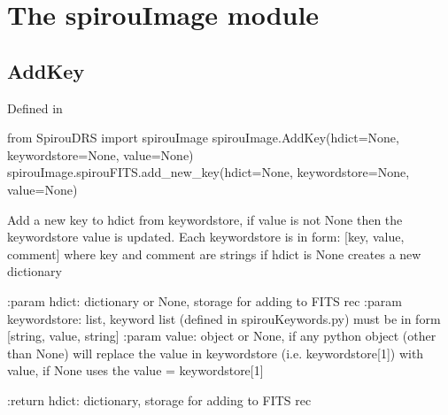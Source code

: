 
\clearpage
\newpage
\noindent\begin{minipage}{\textwidth}
\section{The spirouImage module}
\label{ch:the_module:spirouImage}

\subsection{AddKey}

Defined in \spirouImage{}

\begin{pythonbox}
from SpirouDRS import spirouImage
spirouImage.AddKey(hdict=None, keywordstore=None, value=None)
spirouImage.spirouFITS.add_new_key(hdict=None, keywordstore=None, value=None)
\end{pythonbox}

\begin{pythondocstring}
Add a new key to hdict from keywordstore, if value is not None then the
keywordstore value is updated. Each keywordstore is in form:
        [key, value, comment]    where key and comment are strings
if hdict is None creates a new dictionary

:param hdict: dictionary or None, storage for adding to FITS rec
:param keywordstore: list, keyword list (defined in spirouKeywords.py)
                     must be in form [string, value, string]
:param value: object or None, if any python object (other than None) will
              replace the value in keywordstore (i.e. keywordstore[1]) with
              value, if None uses the value = keywordstore[1]

:return hdict: dictionary, storage for adding to FITS rec
\end{pythondocstring}
\end{minipage}

